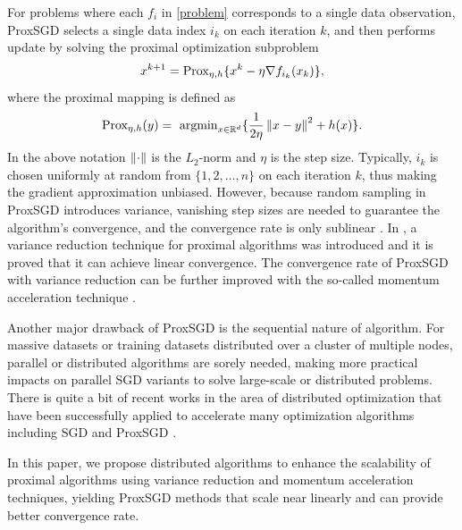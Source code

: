 For problems where each $f_i$ in \eqref{problem} corresponds to a single data observation, ProxSGD selects a single data index $i_k$ on each iteration $k$, and then performs update by solving the proximal optimization subproblem
\[
x^{k+1} = \text{Prox}_{\eta, h}\{x^{k} -\eta \nabla f_{i_k} (x_k)\},
\]
where the proximal mapping is defined as 
\[
\text{Prox}_{\eta,h}(y) = \displaystyle{\text{ argmin}}_{x\in\mathbb{R}^d}\{\frac{1}{2\eta}\left\lVert x-y\right\rVert^2+h(x)\}.
\]
In the above notation $\left\lVert\cdot\right\rVert$ is the $L_2$-norm and $\eta$ is the step size.
Typically, $i_k$ is chosen uniformly at random from $\{1, 2,\ldots, n\}$ on each iteration $k$, thus making the gradient approximation unbiased. However, because random sampling in ProxSGD introduces variance, vanishing step sizes are needed to guarantee the algorithm's convergence,
and the convergence rate is only sublinear \cite{Langford2009,rakhlin2012making}. In \cite{Xiao2014}, a variance reduction technique for proximal algorithms was introduced and it is proved that it can achieve linear convergence. The convergence rate of ProxSGD with variance reduction can be further improved with the so-called momentum acceleration technique \cite{Allen-Zhu17}.

Another major drawback of ProxSGD is the sequential nature of algorithm. For massive datasets or training datasets distributed over a cluster of multiple nodes, parallel or distributed algorithms are sorely needed, making more practical impacts on parallel SGD variants to solve large-scale or distributed problems. There is quite a bit of recent works in the area of distributed optimization that have been successfully applied to accelerate many optimization algorithms including SGD \cite{Agarwal2014,Recht2011,Mania2017} and ProxSGD \cite{LiP2016,Meng2017}.   

In this paper, we propose distributed algorithms to enhance the scalability of proximal algorithms using variance reduction and momentum acceleration techniques, yielding ProxSGD methods that scale near linearly and can provide better convergence rate.

